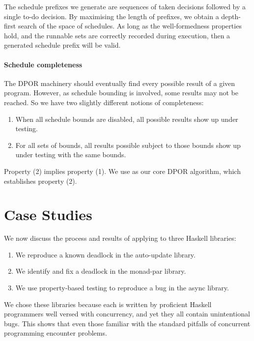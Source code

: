 The schedule prefixes we generate are sequences of taken decisions
followed by a single to-do decision.  By maximising the length of
prefixes, we obtain a depth-first search of the space of schedules.
As long as the well-formedness properties hold, and the runnable sets
are correctly recorded during execution, then a generated schedule
prefix will be valid.

\paragraph{Schedule completeness}
The DPOR machinery should eventually find every possible result of a
given program.  However, as schedule bounding is involved, some
results may not be reached.  So we have two slightly different notions
of completeness:

\begin{enumerate}
\item When all schedule bounds are disabled, all possible results show
  up under testing.
\item For all sets of bounds, all results possible subject to those
  bounds show up under testing with the same bounds.
\end{enumerate}

Property (2) implies property (1).  We use \cite{coons2013} as our
core DPOR algorithm, which establishes property (2).

\section{Case Studies}
\label{sec:dejafu-casestudies}

We now discuss the process and results of applying \dejafu{} to three
Haskell libraries:

\begin{enumerate}
\item We reproduce a known deadlock in the auto-update
  library\cite{auto_update}.
\item We identify and fix a deadlock in the monad-par
  library\cite{monad_par,marlow2011}.
\item We use property-based testing to reproduce a bug in the async
  library\cite{async}.
\end{enumerate}

We chose these libraries because each is written by proficient Haskell
programmers well versed with concurrency, and yet they all contain
unintentional bugs.  This shows that even those familiar with the
standard pitfalls of concurrent programming encounter problems.

